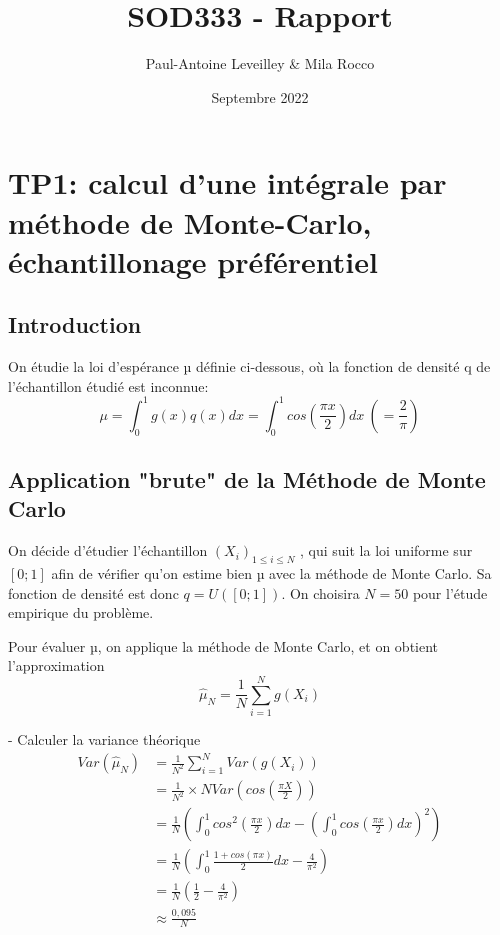 \documentclass{article}
\title{SOD333 - Rapport}
\author{Paul-Antoine Leveilley \& Mila Rocco}
\date{Septembre 2022}
\begin{document}
\maketitle

\begin{center}

\end{center}







\newpage
\section{TP1: calcul d'une intégrale par méthode de Monte-Carlo, échantillonage préférentiel}

\subsection{Introduction}
On étudie la loi d'espérance µ définie ci-dessous, où la fonction de densité q de l'échantillon étudié est inconnue:
$$\mu = \int_0^1 g(x)q(x)dx = \int_0^1 cos(\frac{\pi x}{2})dx\ (=\frac{2}{\pi})$$

 \subsection{Application "brute" de la Méthode de Monte Carlo}
On décide d'étudier l'échantillon $(X_i)_{1\leq i \leq N}$ , qui suit la loi uniforme sur $[0;1]$ afin de vérifier qu'on estime bien µ avec la méthode de Monte Carlo. Sa fonction de densité est donc $q=U([0;1])$. On choisira $N=50$ pour l'étude empirique du problème.

Pour évaluer µ, on applique la méthode de Monte Carlo, et on obtient l'approximation 
$$\hat{\mu}_N = \frac{1}{N} \sum_{i=1}^N g(X_i)$$

- Calculer la variance théorique\\
\begin{align*} 
  Var(\hat{\mu}_N) &= \frac1{N^2} \sum_{i=1}^N Var(g(X_i))\\ 
  &= \frac1{N^2}\times N Var(cos(\frac{\pi X}2)) \\ 
  &= \frac1{N} \left ( \int_0^1 cos^2(\frac{\pi x}2)dx - \left ( \int_0^1 cos(\frac{\pi x}2)dx \right )^2 \right )\\
  &= \frac1{N} \left ( \int_0^1 \frac{1+cos(\pi x)}{2}dx - 
   \frac4{\pi^2} \right )\\
  &= \frac1{N} \left ( \frac{1}{2} - 
   \frac4{\pi^2} \right )\\
  &\approx \frac{0,095}{N}
\end{align*}
\end{document}
